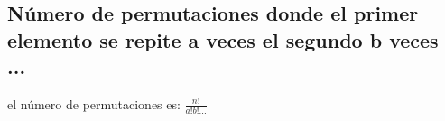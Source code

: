 \subsection{Número de permutaciones donde el primer elemento se repite a veces el segundo b veces ...}
el número de permutaciones es:
$\frac{n!}{a!b!...}$
